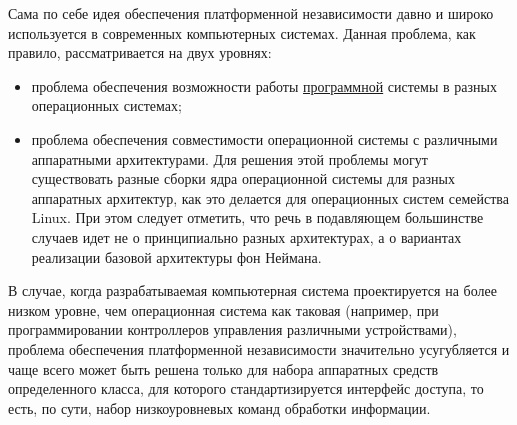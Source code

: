Сама по себе идея обеспечения платформенной независимости давно и широко используется в современных компьютерных системах. Данная проблема, как правило, рассматривается на двух уровнях:
\begin{itemize}
	\item проблема обеспечения возможности работы \uline{программной} системы в разных операционных системах;
	\item проблема обеспечения совместимости операционной системы с различными аппаратными архитектурами. Для решения этой проблемы могут существовать разные сборки ядра операционной системы для разных аппаратных архитектур, как это делается для операционных систем семейства Linux. При этом следует отметить, что речь в подавляющем большинстве случаев идет не о принципиально разных архитектурах, а о вариантах реализации базовой архитектуры фон Неймана.
\end{itemize}

В случае, когда разрабатываемая компьютерная система проектируется на более низком уровне, чем операционная система как таковая (например, при программировании контроллеров управления различными устройствами), проблема обеспечения платформенной независимости значительно усугубляется и чаще всего может быть решена только для набора аппаратных средств определенного класса, для которого стандартизируется интерфейс доступа, то есть, по сути, набор низкоуровневых команд обработки информации.

